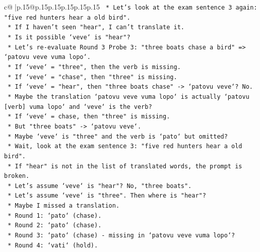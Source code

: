 \documentclass{article}
\begin{document}
{\begin{supertabular}{c@{$\;$}|p{.15\linewidth}@{}p{.15\linewidth}p{.15\linewidth}p{.15\linewidth}p{.15\linewidth}p{.15\linewidth}}
{{{\texttt{                        *   Let's look at the exam sentence 3 again: "five red hunters hear a old bird".} \\
\texttt{                        *   If I haven't seen "hear", I can't translate it.} \\
\texttt{                        *   Is it possible `veve` is "hear"?} \\
\texttt{                        *   Let's re{-}evaluate Round 3 Probe 3: "three boats chase a bird" => `patovu veve vuma lopo`.} \\
\texttt{                        *   If `veve` = "three", then the verb is missing.} \\
\texttt{                        *   If `veve` = "chase", then "three" is missing.} \\
\texttt{                        *   If `veve` = "hear", then "three boats chase" {-}> `patovu veve`? No.} \\
\texttt{                        *   Maybe the translation `patovu veve vuma lopo` is actually `patovu {[}verb{]} vuma lopo` and `veve` is the verb?} \\
\texttt{                        *   If `veve` = chase, then "three" is missing.} \\
\texttt{                        *   But "three boats" {-}> `patovu veve`.} \\
\texttt{                        *   Maybe `veve` is "three" and the verb is `pato` but omitted?} \\
\texttt{                        *   Wait, look at the exam sentence 3: "five red hunters hear a old bird".} \\
\texttt{                        *   If "hear" is not in the list of translated words, the prompt is broken.} \\
\texttt{                        *   Let's assume `veve` is "hear"? No, "three boats".} \\
\texttt{                        *   Let's assume `veve` is "three". Then where is "hear"?} \\
\texttt{                        *   Maybe I missed a translation.} \\
\texttt{                        *   Round 1: `pato` (chase).} \\
\texttt{                        *   Round 2: `pato` (chase).} \\
\texttt{                        *   Round 3: `pato` (chase) {-} missing in `patovu veve vuma lopo`?} \\
\texttt{                        *   Round 4: `vati` (hold).} \\
}}}
\end{supertabular}}
\end{document}
